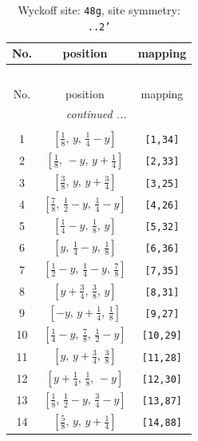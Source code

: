 \documentclass[fleqn,8pt]{jsarticle}
\begin{document}
\begin{longtable}{ccc}
\caption{Wyckoff site: {\tt 48g}, site symmetry: {\tt ..2'}}
 \\
 \hline \hline
No. & position & mapping \\ \hline \endfirsthead

\multicolumn{2}{l}{\tablename\ \thetable{}} \\
 \hline \hline
No. & position & mapping \\ \hline \endhead

 \hline \hline
\multicolumn{2}{r}{\footnotesize\it continued ...} \\ \endfoot

 \hline \hline
\multicolumn{2}{r}{} \\ \endlastfoot

1 & $\left[ \frac{1}{8},\, y,\, \frac{1}{4} - y \right]$ & {\tt [1,34]} \\ \hline
2 & $\left[ \frac{1}{8},\, - y,\, y + \frac{1}{4} \right]$ & {\tt [2,33]} \\ \hline
3 & $\left[ \frac{3}{8},\, y,\, y + \frac{3}{4} \right]$ & {\tt [3,25]} \\ \hline
4 & $\left[ \frac{7}{8},\, \frac{1}{2} - y,\, \frac{1}{4} - y \right]$ & {\tt [4,26]} \\ \hline
5 & $\left[ \frac{1}{4} - y,\, \frac{1}{8},\, y \right]$ & {\tt [5,32]} \\ \hline
6 & $\left[ y,\, \frac{1}{4} - y,\, \frac{1}{8} \right]$ & {\tt [6,36]} \\ \hline
7 & $\left[ \frac{1}{2} - y,\, \frac{1}{4} - y,\, \frac{7}{8} \right]$ & {\tt [7,35]} \\ \hline
8 & $\left[ y + \frac{3}{4},\, \frac{3}{8},\, y \right]$ & {\tt [8,31]} \\ \hline
9 & $\left[ - y,\, y + \frac{1}{4},\, \frac{1}{8} \right]$ & {\tt [9,27]} \\ \hline
10 & $\left[ \frac{1}{4} - y,\, \frac{7}{8},\, \frac{1}{2} - y \right]$ & {\tt [10,29]} \\ \hline
11 & $\left[ y,\, y + \frac{3}{4},\, \frac{3}{8} \right]$ & {\tt [11,28]} \\ \hline
12 & $\left[ y + \frac{1}{4},\, \frac{1}{8},\, - y \right]$ & {\tt [12,30]} \\ \hline
13 & $\left[ \frac{1}{8},\, \frac{1}{2} - y,\, \frac{3}{4} - y \right]$ & {\tt [13,87]} \\ \hline
14 & $\left[ \frac{5}{8},\, y,\, y + \frac{1}{4} \right]$ & {\tt [14,88]} \\ \hline

\end{longtable}
\end{document}
